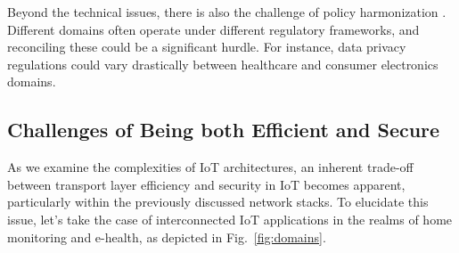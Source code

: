 \documentclass{ieeeaccess}
\begin{document}
Beyond the technical issues, there is also the challenge of policy harmonization \cite{bringhenti2021toward}. Different domains often operate under different regulatory frameworks, and reconciling these could be a significant hurdle. For instance, data privacy regulations could vary drastically between healthcare and consumer electronics domains.

\subsection{Challenges of Being both Efficient and Secure}
As we examine the complexities of IoT architectures, an inherent trade-off between transport layer efficiency and security in IoT becomes apparent, particularly within the previously discussed network stacks. To elucidate this issue, let's take the case of interconnected IoT applications in the realms of home monitoring and e-health, as depicted in Fig.~\ref{fig:domains}.
\end{document}
